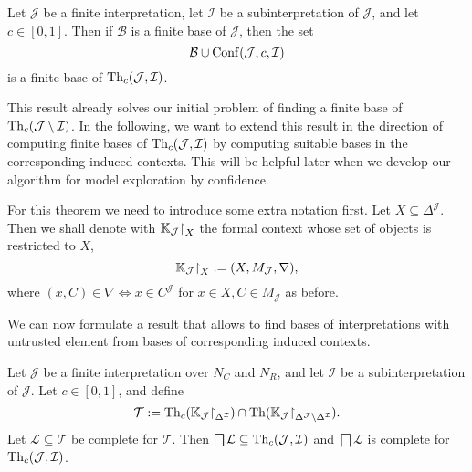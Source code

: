 \begin{Theorem}
  \label{thm:finite-base-of-interpretation-with-untrusted-individuals}
  Let $\mathcal{J}$ be a finite interpretation, let $\mathcal{I}$ be a
  subinterpretation of $\mathcal{J}$, and let $c \in [0,1]$.  Then if $\mathcal{B}$ is a
  finite base of $\mathcal{J}$, then the set
  \begin{equation*}
    \mathcal{B} \cup \operatorname{Conf}(\mathcal{J}, c, \mathcal{I})
  \end{equation*}
  is a finite base of $\operatorname{Th}_{c}(\mathcal{J}, \mathcal{I})$.
\end{Theorem}

This result already solves our initial problem of finding a finite base of
$\operatorname{Th}_{c}(\mathcal{J} \setminus \mathcal{I})$.  In the following, we want to extend this
result in the direction of computing finite bases of $\operatorname{Th}_{c}(\mathcal{J}, \mathcal{I})$
by computing suitable bases in the corresponding induced contexts.  This will be helpful
later when we develop our algorithm for model exploration by confidence.

\def\restricted{\mathord{\upharpoonright}}

For this theorem we need to introduce some extra notation first.  Let $X \subseteq
\Delta^{\mathcal{J}}$.  Then we shall denote with $\con K_{\mathcal{J}}\restricted_{X}$
the formal context whose set of objects is restricted to $X$, \ie
\begin{equation*}
  \con K_{\mathcal{J}}\restricted_{X} := (X, M_{\mathcal{J}}, \nabla),
\end{equation*}
where $(x, C) \in \nabla \iff x \in C^{\mathcal{J}}$ for $x \in X, C \in M_{\mathcal{J}}$
as before.

We can now formulate a result that allows to find bases of interpretations with untrusted
element from bases of corresponding induced contexts.

\begin{Theorem}
  \label{thm:bases-of-untrusted-interpretations-from-bases-of-contexts}
  Let $\mathcal{J}$ be a finite interpretation over $N_{C}$ and $N_{R}$, and let
  $\mathcal{I}$ be a subinterpretation of $\mathcal{J}$.  Let $c \in [0,1]$, and define
  \begin{equation*}
    \mathcal{T} := \Th_{c}(\con K_{\mathcal{J}}\restricted_{\Delta^{\mathcal{I}}}) \cap
    \Th(\con K_{\mathcal{J}}\restricted_{\Delta^{\mathcal{J}}\setminus\Delta^{\mathcal{I}}}).
  \end{equation*}
  Let $\mathcal{L} \subseteq \mathcal{T}$ be complete for $\mathcal{T}$.  Then $\bigsqcap
  \mathcal{L} \subseteq \operatorname{Th}_{c}(\mathcal{J}, \mathcal{I})$ and $\bigsqcap \mathcal{L}$ is
  complete for $\operatorname{Th}_{c}(\mathcal{J}, \mathcal{I})$.
\end{Theorem}

